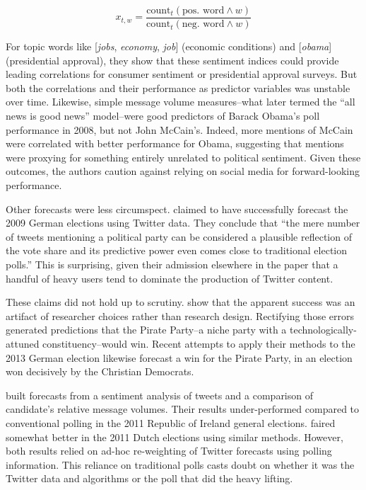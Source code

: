 \documentclass{article}
\begin{document}
\begin{equation}
  \label{eq:2}
  x_{t,w} = \frac{\textrm{count}_t(\textrm{pos. word} \wedge w)}{\textrm{count}_t(\textrm{neg. word} \wedge w)}
\end{equation}

For topic words like [\textit{jobs}, \textit{economy}, \textit{job}]
(economic conditions) and [\textit{obama}] (presidential approval),
they show that these sentiment indices could provide leading
correlations for consumer sentiment or presidential approval
surveys. But both the correlations and their performance as predictor
variables was unstable over time. Likewise, simple message volume
measures--what \citep{digrazia2013} later termed the ``all news is
good news'' model--were good predictors of Barack Obama's poll
performance in 2008, but not John McCain's. Indeed, more mentions of
McCain were correlated with better performance for Obama, suggesting
that mentions were proxying for something entirely unrelated
to political sentiment. Given these
outcomes, the authors caution against relying on social media for
forward-looking performance.

Other forecasts were less circumspect. \cite{tumasjan2010election}
claimed to have successfully forecast the 2009 German elections using
Twitter data. They conclude that ``the mere number of tweets
mentioning a political party can be considered a plausible reflection
of the vote share and its predictive power even comes close to
traditional election polls.'' This is surprising, given their
admission elsewhere in the paper that a handful of heavy users tend to
dominate the production of Twitter content. 

These claims did not hold up to scrutiny.
\cite{jungherr2012pirate} show that the apparent success was an
artifact of researcher choices rather than research design. Rectifying
those errors generated predictions that the Pirate Party--a niche
party with a technologically-attuned constituency--would win. Recent
attempts to apply their methods to the 2013 German election likewise
forecast a win for the Pirate Party, in an election won decisively by
the Christian Democrats.

\cite{bermingham2011using} built forecasts from a sentiment analysis
of tweets and a comparison of candidate's relative message
volumes. Their results under-performed compared to conventional
polling in the 2011 Republic of Ireland general
elections. \cite{sang2012predicting} faired somewhat better in the
2011 Dutch elections using similar methods. However, both results relied on ad-hoc
re-weighting of Twitter forecasts using polling information. This
reliance on traditional polls casts doubt on whether it was the
Twitter data and algorithms or the poll that did the heavy lifting.
\end{document}
